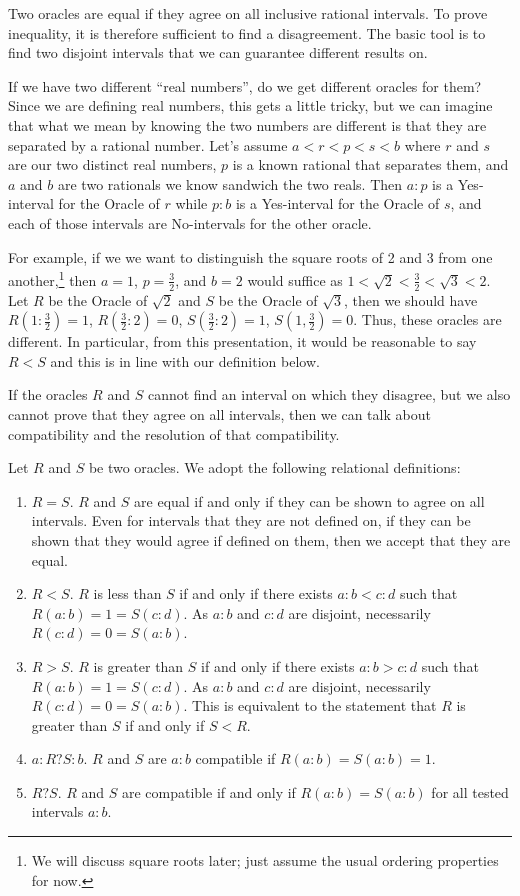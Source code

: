 \documentclass[12pt]{article}
\begin{document}
Two oracles are equal if they agree on all inclusive rational intervals. To prove inequality, it is therefore sufficient to find a disagreement. The basic tool is to find two disjoint intervals that we can guarantee different results on. 

If we have two different ``real numbers'', do we get different oracles for them? Since we are defining real numbers, this gets a little tricky, but we can imagine that what we mean by knowing the two numbers are different is that they are separated by a rational number. Let's assume $a < r < p < s < b$ where $r$ and $s$ are our two distinct real numbers,  $p$ is a known rational that separates them, and $a$ and $b$ are two rationals we know sandwich the two reals. Then $a:p$ is a Yes-interval for the Oracle of $r$ while $p:b$ is a Yes-interval for the Oracle of $s$, and each of those intervals are No-intervals for the other oracle. 

For example, if we we want to distinguish the square roots of 2 and 3 from one another,\footnote{We will discuss square roots later; just assume the usual ordering properties for now.} then $a = 1$, $p = \tfrac{3}{2}$, and $b = 2$ would suffice as $1 < \sqrt{2} < \tfrac{3}{2} < \sqrt{3} < 2$. Let $R$ be the Oracle of $\sqrt{2}$ and $S$ be the Oracle of $\sqrt{3}$, then we should have $R(1:\tfrac{3}{2}) = 1$, $R(\tfrac{3}{2}:2) = 0$,  $S(\tfrac{3}{2}:2) = 1$, $S(1, \tfrac{3}{2}) = 0$. Thus, these oracles are different. In particular, from this presentation, it would be reasonable to say $R < S$ and this is in line with our definition below.

If the oracles $R$ and $S$ cannot find an interval on which they disagree, but we also cannot prove that they agree on all intervals, then we can talk about compatibility and the resolution of that compatibility.

Let $R$ and $S$ be two oracles. We adopt the following relational definitions:

\begin{enumerate}
    \item $R=S$. $R$ and $S$ are equal if and only if they can be shown to agree on all intervals. Even for intervals that they are not defined on, if they can be shown that they would agree if defined on them, then we accept that they are equal. 
    \item $R < S$. $R$ is less than $S$ if and only if there exists $a:b < c:d$ such that $R(a:b) =1 = S(c:d)$. As $a:b$ and $c:d$ are disjoint, necessarily $R(c:d) = 0 = S(a:b)$. 
    \item $R > S$. $R$ is greater than $S$ if and only if there exists $a:b > c:d$ such that $R(a:b) =1 = S(c:d)$. As $a:b$ and $c:d$ are disjoint, necessarily $R(c:d) = 0 = S(a:b)$. This is equivalent to the statement that $R$ is greater than $S$ if and only if $S < R$. 
    \item $a:R?S:b$. $R$ and $S$ are $a:b$ compatible if $R(a:b)=S(a:b) = 1$. 
    \item $R ? S$. $R$ and $S$ are compatible if and only if $R(a:b) = S(a:b)$ for all tested intervals $a:b$. 
\end{enumerate}
\end{document}
